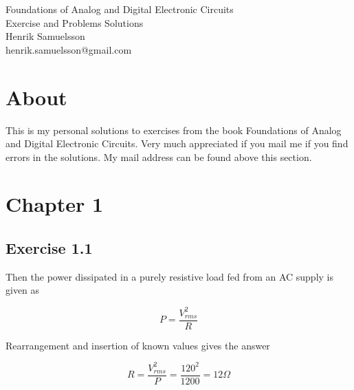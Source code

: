 \documentclass[]{article}
\begin{document}
\begingroup  
	\raggedright
	\Large Foundations of Analog and Digital Electronic Circuits\\
	\Large Exercise and Problems Solutions\\
	\vspace{3mm} %
	\normalsize Henrik Samuelsson\\
	\normalsize henrik.samuelsson@gmail.com
\endgroup
	
\section*{About}
	This is my personal solutions to exercises from the book Foundations of Analog and Digital Electronic Circuits. Very much appreciated if you mail me if you find errors in the solutions. My mail address can be found above this section.

\section*{Chapter 1}

\subsection*{Exercise 1.1}
	
	Then the power dissipated in a purely resistive load fed from an AC supply is given as
	
	\begin{equation*}
		P = \dfrac{ V^{2}_{rms} }{ R }
	\end{equation*}
		
	Rearrangement and insertion of known values gives the answer
	
	\begin{equation*}
		R = \dfrac{ V^{2}_{rms} }{ P } = \dfrac{ 120^{2} }{ 1200 } = 12 \Omega
	\end{equation*}	
	
\end{document}
